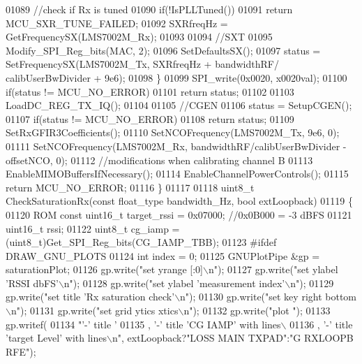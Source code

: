 \begin{DoxyCode}
{{{{{{{{{{{{{{{{{{{{01089         \textcolor{comment}{//check if Rx is tuned}
01090         \textcolor{keywordflow}{if}(!IsPLLTuned())
01091             \textcolor{keywordflow}{return} MCU_SXR_TUNE_FAILED;
01092         SXRfreqHz = GetFrequencySX(LMS7002M_Rx);
01093 
01094         \textcolor{comment}{//SXT}
01095         Modify_SPI_Reg_bits(MAC, 2);
01096         SetDefaultsSX();
01097         status = SetFrequencySX(LMS7002M_Tx, SXRfreqHz + bandwidthRF/ 
      calibUserBwDivider + 9e6);
01098     \}
01099     SPI_write(0x0020, x0020val);
01100     \textcolor{keywordflow}{if}(status != MCU_NO_ERROR)
01101         \textcolor{keywordflow}{return} status;
01102 
01103     LoadDC_REG_TX_IQ();
01104 
01105     \textcolor{comment}{//CGEN}
01106     status = SetupCGEN();
01107     \textcolor{keywordflow}{if}(status != MCU_NO_ERROR)
01108         \textcolor{keywordflow}{return} status;
01109     SetRxGFIR3Coefficients();
01110     SetNCOFrequency(LMS7002M_Tx, 9e6, 0);
01111     SetNCOFrequency(LMS7002M_Rx, bandwidthRF/calibUserBwDivider - offsetNCO, 0);
01112     \textcolor{comment}{//modifications when calibrating channel B}
01113     EnableMIMOBuffersIfNecessary();
01114     EnableChannelPowerControls();
01115     \textcolor{keywordflow}{return} MCU_NO_ERROR;
01116 \}
01117 
01118 uint8\_t CheckSaturationRx(\textcolor{keyword}{const} float_type bandwidth\_Hz, \textcolor{keywordtype}{bool} extLoopback)
01119 \{
01120     ROM \textcolor{keyword}{const} uint16\_t target\_rssi = 0x07000; \textcolor{comment}{//0x0B000 = -3 dBFS}
01121     uint16\_t rssi;
01122     uint8\_t cg\_iamp = (uint8\_t)Get_SPI_Reg_bits(CG_IAMP_TBB);
01123 \textcolor{preprocessor}{#ifdef DRAW\_GNU\_PLOTS}
01124     \textcolor{keywordtype}{int} index = 0;
01125     GNUPlotPipe &gp = saturationPlot;
01126     gp.write(\textcolor{stringliteral}{"set yrange [:0]\(\backslash\)n"});
01127     gp.write(\textcolor{stringliteral}{"set ylabel 'RSSI dbFS'\(\backslash\)n"});
01128     gp.write(\textcolor{stringliteral}{"set ylabel 'measurement index'\(\backslash\)n"});
01129     gp.write(\textcolor{stringliteral}{"set title 'Rx saturation check'\(\backslash\)n"});
01130     gp.write(\textcolor{stringliteral}{"set key right bottom\(\backslash\)n"});
01131     gp.write(\textcolor{stringliteral}{"set grid ytics xtics\(\backslash\)n"});
01132     gp.write(\textcolor{stringliteral}{"plot "});
01133     gp.writef(
01134         \textcolor{stringliteral}{"'-' title '%
01135 \textcolor{stringliteral}{, '-' title 'CG IAMP' with lines\(\backslash\)}
01136 \textcolor{stringliteral}{, '-' title 'target Level' with lines\(\backslash\)n"}, extLoopback?\textcolor{stringliteral}{"LOSS MAIN TXPAD"}:\textcolor{stringliteral}{"G RXLOOPB RFE"});
}}}}}}}}}}}}}}}}}}}}}
\end{DoxyCode}
